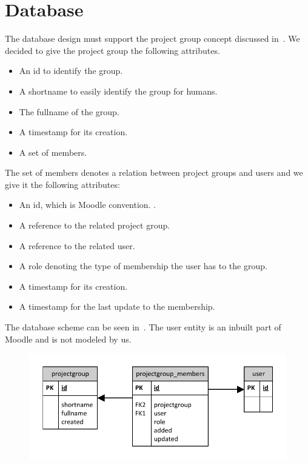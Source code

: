 \section{Database}
The database design must support the project group concept discussed in~. 
We decided to give the project group the following attributes. 
\begin{itemize}
	\item An id to identify the group. 
	\item A shortname to easily identify the group for humans. 
	\item The fullname of the group. 
	\item A timestamp for its creation. 
	\item A set of members. 
\end{itemize}
The set of members denotes a relation between project groups and users and we give it the following attributes: 
\begin{itemize}
	\item An id, which is Moodle convention. \cite{http://docs.moodle.org/dev/Database}.
	\item A reference to the related project group.
	\item A reference to the related user.
	\item A role denoting the type of membership the user has to the group.
	\item A timestamp for its creation.
	\item A timestamp for the last update to the membership. 
\end{itemize}
The database scheme can be seen in~. 
The user entity is an inbuilt part of Moodle and is not modeled by us. 
\begin{figure}
	\centering
		\includegraphics{images/projectgroupsdb.pdf}
	\label{fig:projectgroupsdb}
\end{figure}


